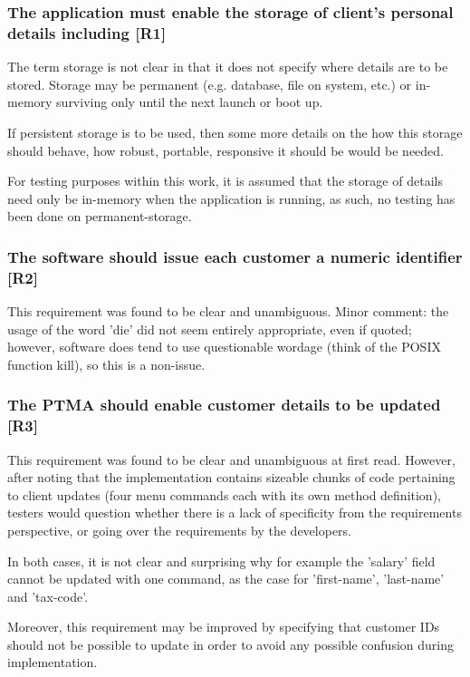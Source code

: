 \subsubsection{The application must enable the storage of client’s personal details including [R1]}
The term storage is not clear in that it does not specify where details are to be stored. 
Storage may be permanent (e.g. database, file on system, etc.) or in-memory surviving only until the next launch or boot up. 
\par
If persistent storage is to be used, then some more details on the how this storage should behave, how robust, portable, responsive it should be would be needed. 
\par
For testing purposes within this work, it is assumed that the storage of details need only be in-memory when the application is running, as such, no testing has been done on permanent-storage.

\subsubsection{The software should issue each customer a numeric identifier [R2]}
This requirement was found to be clear and unambiguous. 
Minor comment: the usage of the word 'die' did not seem entirely appropriate, even if quoted; however, software does tend to use questionable wordage (think of the POSIX function kill), so this is a non-issue.  

\subsubsection{The PTMA should enable customer details to be updated [R3]}
This requirement was found to be clear and unambiguous at first read. 
However, after noting that the implementation contains sizeable chunks of code pertaining to client updates (four menu commands each with its own method definition), testers would question whether there is a lack of specificity from the requirements perspective, or going over the requirements by the developers. 
\par
In both cases, it is not clear and surprising why for example the 'salary' field cannot be updated with one command, as the case for 'first-name', 'last-name' and 'tax-code'.  
\par
Moreover, this requirement may be improved by specifying that customer IDs should not be possible to update in order to avoid any possible confusion during implementation. 

